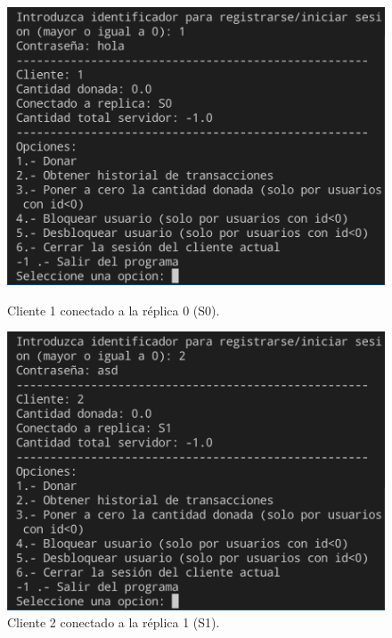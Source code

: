 \documentclass{article}
\begin{document}
\begin{figure}[H]
    \centering
    \begin{minipage}[H]{0.49\textwidth}
        \centering
        \includegraphics[width=\textwidth]{imagenes/3replicasS0.png}
        \caption{Cliente 1 conectado a la réplica 0 (S0).}        
    \end{minipage}
    \hfill
    \begin{minipage}[H]{0.49\textwidth}
        \centering
        \includegraphics[width=\textwidth]{imagenes/3replicasS1.png}
        \caption{Cliente 2 conectado a la réplica 1 (S1).}        
    \end{minipage}
\end{figure}
\end{document}
